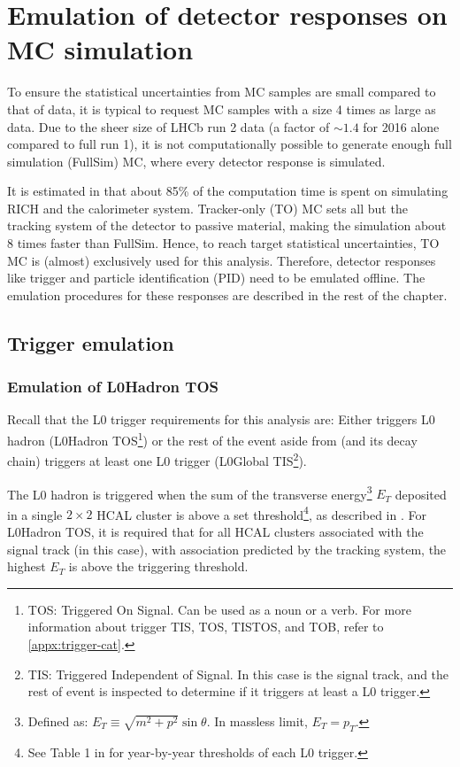 \chapter{Emulation of detector responses on MC simulation}
\label{ref:mc-emulation}

To ensure the statistical uncertainties from MC samples are small compared to
that of data, it is typical to request MC samples with a size 4 times as large
as data.
Due to the sheer size of LHCb run 2 data (a factor of $\sim\!1.4$ for 2016
alone compared to full run 1), it is not computationally possible to generate
enough full simulation (FullSim) MC, where every detector response is simulated.

It is estimated in \cite{LHCb-INT-2019-025}
that about 85\% of the computation time is spent on simulating RICH and the
calorimeter system.
Tracker-only (TO) MC sets all but the tracking system of the detector to
passive material, making the simulation about 8 times faster than FullSim.
Hence, to reach target statistical uncertainties,
TO MC is (almost) exclusively used for this analysis.
Therefore, detector responses like trigger and particle identification (PID)
need to be emulated offline.
The emulation procedures for these responses are described in the rest of the
chapter.


\section{Trigger emulation}
\subsection{Emulation of L0Hadron TOS}

Recall that the L0 trigger requirements for this analysis are: Either \Dz
triggers L0 hadron (\Dz L0Hadron TOS\footnote{
    TOS: Triggered On Signal. Can be used as a noun or a verb.
    For more information about trigger TIS, TOS, TISTOS, and TOB, refer to
    \cref{appx:trigger-cat}.
}) or
the rest of the event aside from \B (and its decay chain) triggers at least
one L0 trigger
(\B L0Global TIS\footnote{
    TIS: Triggered Independent of Signal.
    In this case \B is the signal track, and the rest of event is inspected to
    determine if it triggers at least a L0 trigger.
}).

The L0 hadron is triggered when the sum of the transverse energy\footnote{
    Defined as: $E_T \equiv \sqrt{m^2 + p^2} \sin\theta$.
    In massless limit, $E_T = p_T$.
} $E_T$ deposited
in a single $2 \times 2$ HCAL cluster is above a set threshold\footnote{
    See Table 1 in \cite{LHCb-DP-2019-001} for year-by-year thresholds of each
    L0 trigger.
}, as described in \cite{LHCb-DP-2019-001}.
For L0Hadron TOS, it is required that for all HCAL clusters associated with the
signal track (\Dz in this case), with association predicted by the tracking
system,
the highest $E_T$ is above the triggering threshold.

